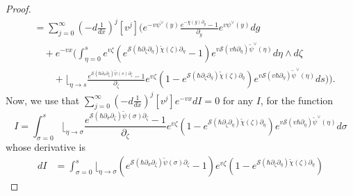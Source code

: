 \documentclass[10pt,a4paper,oneside,no-math,reqno]{amsart}%
\theoremstyle{plain}
\theoremstyle{definition}
\theoremstyle{remark}
\numberwithin{equation}{section}
\newcommand{\mc}[1]{\mathcal{#1}}
\newcommand{\1}{\mathds{1}}
\newcommand{\<}{\langle}
\renewcommand{\>}{\rangle}
\newcommand{\del}{\partial}
\begin{document}
\begin{proof}
\begin{align*}
        &=
        \sum_{j=0}^\infty (-d \frac{1}{dx})^j [v^j ] 
		\Bigg( 
        e^{-v \psi^\vee (y)}  \frac{e^{-\chi (g) \del_y} - 1}{\del_y} e^{v \psi^\vee (y )} dg 
        \\
        &\quad
        + 
        e^{-vx}
        \bigg( 
        \int_{\eta = 0}^s  e^{v\zeta} (e^{ \mc{S}(\hbar \del_\zeta \del_\eta) \tilde{\chi}(\zeta) \del_\eta } - 1)
		e^{v \mc{S}(v\hbar \del_{\eta}) \tilde{\psi}^\vee(\eta) } d\eta \wedge d\zeta
        \\
		& \qquad
		+
		\Big\lfloor_{\eta \to s}
        \frac{e^{ \mc{S}(\hbar \del_s \del_\zeta  ) \tilde{\psi}(s) \del_\zeta } - 1}{\del_\zeta } e^{v\zeta} (1 - e^{ \mc{S}(\hbar \del_\zeta \del_\eta) \tilde{\chi}(\zeta) \del_\eta } )
		e^{v \mc{S}(v\hbar \del_{\eta}) \tilde{\psi}^\vee(\eta) }
 		ds \bigg) \Bigg) .
	\end{align*}
	Now, we use that $\sum_{j=0}^\infty (-d \frac{1}{dx})^j [v^j ] e^{-vx} dI = 0 $ for any $ I$, for the function
	\begin{equation}
		I
		=
		\int_{\sigma=0}^{s} \Big\lfloor_{\eta \to \sigma} \frac{e^{ \mc{S}(\hbar \del_\sigma \del_\zeta  ) \tilde{\psi}(\sigma) \del_\zeta} - 1}{\del_\zeta } e^{v \zeta} (1 - e^{ \mc{S}(\hbar \del_\zeta \del_\eta) \tilde{\chi}(\zeta) \del_\eta } )
			e^{v \mc{S}(v\hbar \del_{\eta}) \tilde{\psi}^\vee(\eta) }
 			d\sigma
	\end{equation}
	whose derivative is
	\begin{equation*}
		\begin{split}
			dI
			&=
			\int_{\sigma = 0}^s \Big\lfloor_{\eta \to \sigma} (e^{ \mc{S}(\hbar \del_\sigma \del_\zeta) \tilde{\psi}(\sigma) \del_\zeta} - 1) e^{v\zeta} (1 - e^{ \mc{S}(\hbar \del_\zeta \del_\eta) \tilde{\chi}(\zeta) \del_\eta } )

\end{split}
\end{equation*}
\end{proof}
\end{document}
